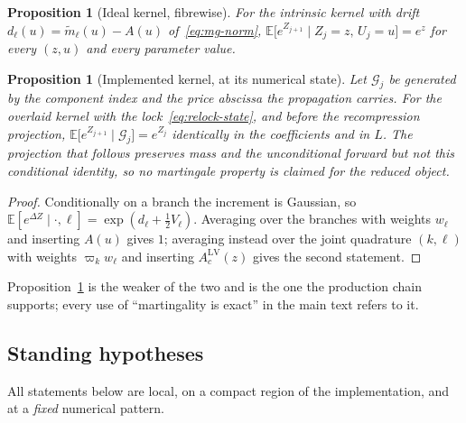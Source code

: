 \documentclass[11pt]{article}
\newtheorem{proposition}[theorem]{Proposition}
\newcommand{\E}{\mathbb{E}}
\newcommand{\cG}{\mathcal{G}}
\providecommand{\1}{\mathbf 1}
\begin{document}
\begin{proposition}[Ideal kernel, fibrewise]
\label{prop:mg-ideal}
For the intrinsic kernel with drift $d_\ell(u)=\widetilde m_\ell(u)-A(u)$ of~\eqref{eq:mg-norm},
$\E\bigl[e^{Z_{j+1}}\mid Z_j=z,\,U_j=u\bigr]=e^{z}$ for every $(z,u)$ and every parameter value.
\end{proposition}

\begin{proposition}[Implemented kernel, at its numerical state]
\label{prop:mg-impl}
Let $\cG_j$ be generated by the component index and the price abscissa the propagation carries. For
the overlaid kernel with the lock~\eqref{eq:relock-state}, and \emph{before} the recompression
projection, $\E\bigl[e^{Z_{j+1}}\mid\cG_j\bigr]=e^{Z_j}$ identically in the coefficients and in $L$.
The projection that follows preserves mass and the unconditional forward but not this conditional
identity, so no martingale property is claimed for the reduced object.
\end{proposition}

\begin{proof}
Conditionally on a branch the increment is Gaussian, so $\E[e^{\Delta Z}\mid\cdot,\ell]
=\exp(d_\ell+\tfrac12V_\ell)$. Averaging over the branches with weights $w_\ell$ and inserting
$A(u)$ gives $1$; averaging instead over the joint quadrature $(k,\ell)$ with weights
$\varpi_kw_\ell$ and inserting $A^{\mathrm{LV}}_c(z)$ gives the second statement.
\end{proof}

\noindent Proposition~\ref{prop:mg-impl} is the weaker of the two and is the one the production
chain supports; every use of ``martingality is exact'' in the main text refers to it.

\subsection{Standing hypotheses}

All statements below are local, on a compact region of the implementation, and at a \emph{fixed}
numerical pattern.
\end{document}
